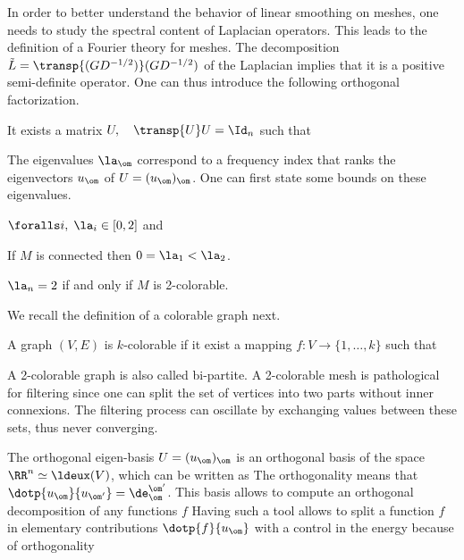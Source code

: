 In order to better understand the behavior of linear smoothing on meshes, one needs to study the spectral content of Laplacian operators. This leads to the definition of a Fourier theory for meshes. The decomposition $\tilde L = \transp{(G D^{-1/2})}(G D^{-1/2})$ of the Laplacian implies that it is a positive semi-definite operator. One can thus introduce the following orthogonal factorization.

\begin{thm} It exists a matrix $U, \quad \transp{U}U=\Id_n$ such that 
\end{thm}


The eigenvalues $\la_\om$ correspond to a frequency index that ranks the eigenvectors $u_\om$ of $U=(u_\om)_\om$. One can first state some bounds on these eigenvalues.

\begin{thm}  $\foralls i, \; \la_i \in [0,2]$ and
\begin{rs}
	\item If $M$ is connected then $0 = \la_1 < \la_2$.
	\item $\la_n=2$ if and only if $M$ is 2-colorable.
\end{rs}
\end{thm}

We recall the definition of a colorable graph next.

\begin{defn}
A graph $(V,E)$ is $k$-colorable if it exist a mapping $f : V \rightarrow \{1,\ldots,k\}$ such that 
\end{defn}

A 2-colorable graph is also called bi-partite. A 2-colorable mesh is pathological for filtering since one can split the set of vertices into two parts without inner connexions. The filtering process can oscillate by exchanging values between these sets, thus never converging. 

The orthogonal eigen-basis $U = (u_\om)_\om$ is an orthogonal basis of the space $\RR^n \simeq \ldeux(V)$, which can be written as
The orthogonality means that $\dotp{u_{\om}}{u_{\om'}} = \de_{\om}^{\om'}$. This basis allows to compute an orthogonal decomposition of any functions $f$
Having such a tool allows to split a function $f$ in elementary contributions $\dotp{f}{u_\om}$ with a control in the energy because of orthogonality

